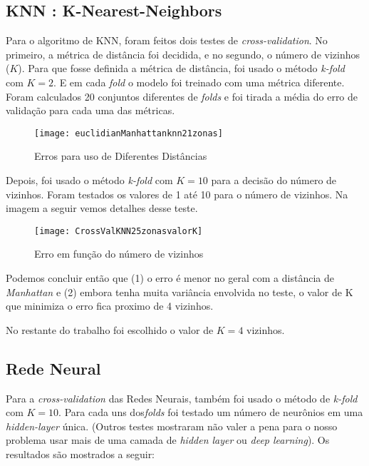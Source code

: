 \subsection{KNN : K-Nearest-Neighbors }


Para o algoritmo de KNN, foram feitos dois testes de \textit{cross-validation}. No primeiro, a métrica de distância foi decidida, e no segundo, o número de vizinhos ($K$).
Para que fosse definida a métrica de distância, foi usado o método  \textit{k-fold}  com $K=2$. E em cada \textit{fold} o modelo foi treinado com uma métrica diferente. Foram calculados 20 conjuntos diferentes de \textit{folds} e foi tirada a média do erro de validação para cada uma das métricas.


\begin{figure}[H]
\centering
\caption{Erros para uso de Diferentes Distâncias}
 \texttt{[image: euclidianManhattanknn21zonas]}
\label{fig:euclidian}  
\end{figure}


Depois, foi usado o método  \textit{k-fold} com $K=10$ para a decisão do número de vizinhos. Foram testados os valores de 1 até 10 para o número de vizinhos. Na imagem a seguir vemos detalhes desse teste.


\begin{figure}[h]
\centering
\caption{Erro em função do número de vizinhos}
 \texttt{[image: CrossValKNN25zonasvalorK]}
\label{fig:euclidian}  
\end{figure}



Podemos concluir então que (1) o erro é menor no geral com a distância de \textit{Manhattan} e (2) embora tenha muita variância envolvida no teste, o valor de K que minimiza o erro fica proximo de 4 vizinhos.


No restante do trabalho foi escolhido o valor de $K=4$ vizinhos.



\subsection{Rede Neural}

Para a \textit{cross-validation} das Redes Neurais, também foi usado o método de  \textit{k-fold} com $K=10$. Para cada uns dos\textit{folds} foi testado um número de neurônios em uma  \textit{hidden-layer} única. (Outros testes mostraram não valer a pena para o nosso problema usar mais de uma camada de  \textit{hidden layer} ou \textit{deep learning}). Os resultados são mostrados a seguir:




